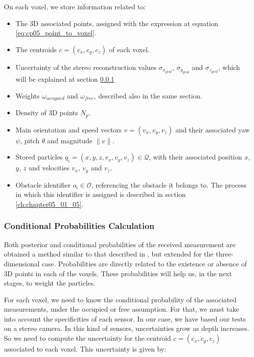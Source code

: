 On each voxel, we store information related to:
\begin{itemize}
 \item The 3D associated points, assigned with the expression at equation \ref{eq:cp05_point_to_voxel}.
 \item The centroids $c=(c_x, c_y, c_z)$ of each voxel.
 \item Uncertainty of the stereo reconstruction values $\sigma_{x_{grid}}$, $\sigma_{y_{grid}}$ and $\sigma_{z_{grid}}$, which will be explained at section \ref{ch:chapter05_01_03_01}
 \item Weights $\omega_{occupied}$ and $\omega_{free}$, described also in the same section.
 \item Density of 3D points $N_p$.
 \item Main orientation and speed vectors $v=(v_x, v_y, v_z)$ and their associated yaw $\psi$, pitch $\theta$ and magnitude $\|v\|$.
 \item Stored particles $q_i = (x, y, z, v_x, v_y, v_z) \in \mathcal{Q}$, with their associated position $x$, $y$, $z$ and velocities $v_x$, $v_y$ and $v_z$.
 \item Obstacle identifier $o_i \in \mathcal{O}$, referencing the obstacle it belongs to. The process in which this identifier is assigned is described in section \ref{ch:chapter05_01_05}.
\end{itemize}

\subsubsection{Conditional Probabilities Calculation}\label{ch:chapter05_01_03_01}

Both posterior and conditional probabilities of the received measurement are obtained a method similar to that described in \cite{isard1998condensation}, but extended for the three-dimensional case. Probabilities are directly related to the existence or absence of 3D points in each of the voxels. These probabilities will help us, in the next stages, to weight the particles.

For each voxel, we need to know the conditional probability of the associated measurements, under the occupied or free assumption. For that, we must take into account the specificities of each sensor. In our case, we have based our tests on a stereo camera. In this kind of sensors, uncertainties grow as depth increases. So we need to compute the uncertainty for the centroid $c=(c_x, c_y, c_z)$ associated to each voxel. This uncertainty is given by:

